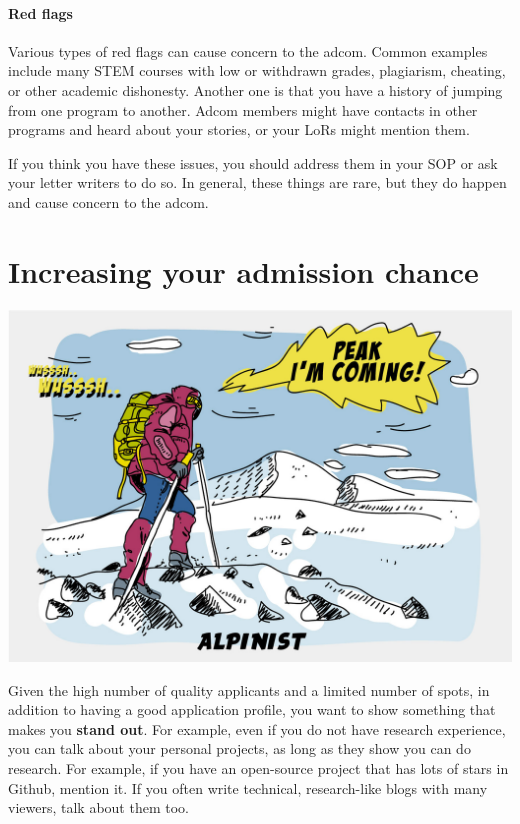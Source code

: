\documentclass[oneside,11pt,dvipsnames]{book}
\newcommand{\subsectioninfo}[1]{%
  \phantomsection
  \addcontentsline{toc}{subsectioninfo}{\textcolor{black}{\texttt #1}}%
}
\begin{document}
\paragraph{Red flags} Various types of red flags can cause concern to the adcom. Common examples include many STEM courses with low or withdrawn grades, plagiarism, cheating, or other academic dishonesty. Another one is that you have a history of jumping from one program to another. Adcom members might have contacts in other programs and heard about your stories, or your LoRs might mention them.

If you think you have these issues, you should address them in your SOP or ask your letter writers to do so.
In general, these things are rare, but they do happen and cause concern to the adcom.



\section{Increasing your admission chance}\label{sec:improve-your-chance}
\subsectioninfo{You can improve your profile by being unique and standing out.}

\begin{center}
  \includegraphics[scale=0.2]{files/alpinist-climbing-peak-mountain-comic-hand-drawn-vector-illustration.jpg}
\end{center}


Given the high number of quality applicants and a limited number of spots, in addition to having a good application profile, you want to show something that makes you \textbf{stand out}.  For example, even if you do not have research experience, you can talk about your personal projects, as long as they show you can do research. For example, if you have an open-source project that has lots of stars in Github, mention it. If you often write technical, research-like blogs with many viewers, talk about them too.
\end{document}
